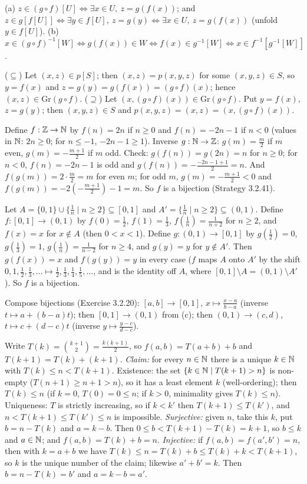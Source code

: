  (a) $z\in(g\circ f)[U]\Leftrightarrow\exists x\in U,\ z=g(f(x))$; and $z\in g[f[U]]\Leftrightarrow\exists y\in f[U],\ z=g(y)\Leftrightarrow\exists x\in U,\ z=g(f(x))$ (unfold $y\in f[U]$). (b) $x\in(g\circ f)^{-1}[W]\Leftrightarrow g(f(x))\in W\Leftrightarrow f(x)\in g^{-1}[W]\Leftrightarrow x\in f^{-1}[g^{-1}[W]]$.

 ($\subseteq$) Let $(x,z)\in p[S]$; then $(x,z)=p(x,y,z)$ for some $(x,y,z)\in S$, so $y=f(x)$ and $z=g(y)=g(f(x))=(g\circ f)(x)$; hence $(x,z)\in\mathrm{Gr}(g\circ f)$. ($\supseteq$) Let $(x,(g\circ f)(x))\in\mathrm{Gr}(g\circ f)$. Put $y=f(x)$, $z=g(y)$; then $(x,y,z)\in S$ and $p(x,y,z)=(x,z)=(x,(g\circ f)(x))$.

 Define $f:\mathbb{Z}\to\mathbb{N}$ by $f(n)=2n$ if $n\ge0$ and $f(n)=-2n-1$ if $n<0$ (values in $\mathbb{N}$: $2n\ge0$; for $n\le-1$, $-2n-1\ge1$). Inverse $g:\mathbb{N}\to\mathbb{Z}$: $g(m)=\frac m2$ if $m$ even, $g(m)=-\frac{m+1}2$ if $m$ odd. Check: $g(f(n))=g(2n)=n$ for $n\ge0$; for $n<0$, $f(n)=-2n-1$ is odd and $g(f(n))=-\frac{-2n-1+1}2=n$. And $f(g(m))=2\cdot\frac m2=m$ for even $m$; for odd $m$, $g(m)=-\frac{m+1}2<0$ and $f(g(m))=-2(-\frac{m+1}2)-1=m$. So $f$ is a bijection (Strategy 3.2.41).

 Let $A=\{0,1\}\cup\{\frac1n\mid n\ge2\}\subseteq[0,1]$ and $A'=\{\frac1n\mid n\ge2\}\subseteq(0,1)$. Define $f:[0,1]\to(0,1)$ by $f(0)=\frac12$, $f(1)=\frac13$, $f(\frac1n)=\frac1{n+2}$ for $n\ge2$, and $f(x)=x$ for $x\notin A$ (then $0<x<1$). Define $g:(0,1)\to[0,1]$ by $g(\frac12)=0$, $g(\frac13)=1$, $g(\frac1n)=\frac1{n-2}$ for $n\ge4$, and $g(y)=y$ for $y\notin A'$. Then $g(f(x))=x$ and $f(g(y))=y$ in every case ($f$ maps $A$ onto $A'$ by the shift $0,1,\frac12,\frac13,\dots\mapsto\frac12,\frac13,\frac14,\frac15,\dots$, and is the identity off $A$, where $[0,1]\setminus A=(0,1)\setminus A'$). So $f$ is a bijection.

 Compose bijections (Exercise 3.2.20): $[a,b]\to[0,1]$, $x\mapsto\frac{x-a}{b-a}$ (inverse $t\mapsto a+(b-a)t$); then $[0,1]\to(0,1)$ from (c); then $(0,1)\to(c,d)$, $t\mapsto c+(d-c)t$ (inverse $y\mapsto\frac{y-c}{d-c}$).

 Write $T(k)=\binom{k+1}2=\frac{k(k+1)}2$, so $f(a,b)=T(a+b)+b$ and $T(k+1)=T(k)+(k+1)$. \emph{Claim:} for every $n\in\mathbb{N}$ there is a unique $k\in\mathbb{N}$ with $T(k)\le n<T(k+1)$. Existence: the set $\{k\in\mathbb{N}\mid T(k+1)>n\}$ is non-empty ($T(n+1)\ge n+1>n$), so it has a least element $k$ (well-ordering); then $T(k)\le n$ (if $k=0$, $T(0)=0\le n$; if $k>0$, minimality gives $T(k)\le n$). Uniqueness: $T$ is strictly increasing, so if $k<k'$ then $T(k+1)\le T(k')$, and $n<T(k+1)\le T(k')\le n$ is impossible. \emph{Surjective:} given $n$, take this $k$, put $b=n-T(k)$ and $a=k-b$. Then $0\le b<T(k+1)-T(k)=k+1$, so $b\le k$ and $a\in\mathbb{N}$; and $f(a,b)=T(k)+b=n$. \emph{Injective:} if $f(a,b)=f(a',b')=n$, then with $k=a+b$ we have $T(k)\le n=T(k)+b\le T(k)+k<T(k+1)$, so $k$ is the unique number of the claim; likewise $a'+b'=k$. Then $b=n-T(k)=b'$ and $a=k-b=a'$.

